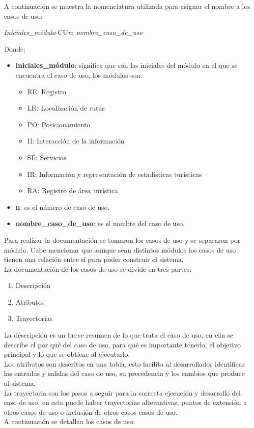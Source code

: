 \newpage
A continuación se muestra la nomenclatura utilizada para asignar el nombre a los casos de uso:

\begin{center}
	\Huge{\textit{Iniciales\_módulo}-CU\textit{n}: \textit{nombre\_caso\_de\_uso}}
\end{center}

Donde: 

\begin{itemize}
	\item \textbf{iniciales\_módulo}: significa que son las iniciales del módulo en el que se encuentra el caso de uso, los módulos son: 
	\begin{itemize}
		\item RE: Registro
		\item LR: Localización de rutas
		\item PO: Posicionamiento
		\item II: Interacción de la información
		\item SE: Servicios
		\item IR: Información y representación de estadísticas turísticas
		\item RA: Registro de área turística
	\end{itemize}

	\item \textbf{n}: es el número de caso de uso.
	
	\item \textbf{nombre\_caso\_de\_uso}: es el nombre del caso de uso.
\end{itemize}

Para realizar la documentación se tomaron los casos de uso y se separaron por módulo. Cabe mencionar que aunque sean distintos módulos los casos de uso tienen una relación entre sí para poder construir el sistema. \\

La documentación de los casos de uso se divide en tres partes:

\begin{enumerate}
	\item Descripción
	\item Atributos
	\item Trayectorias
\end{enumerate}

La descripción es un breve resumen de lo que trata el caso de uso, en ella se describe el por qué del caso de uso, para qué es importante tenerlo, el objetivo principal y lo que se obtiene al ejecutarlo.\\

Los atributos son descritos en una tabla, esto facilita al desarrollador identificar las entradas y salidas del caso de uso, su precedencia y los cambios que produce al sistema. \\

La trayectoria son los pasos a seguir para la correcta ejecución y desarrollo del caso de uso, en esta puede haber trayectorias alternativas, puntos de extensión a otros casos de uso o inclusión de otros casos casos de uso. \\

A continuación se detallan los casos de uso:



